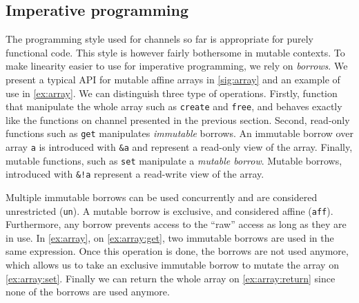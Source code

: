 
\subsection{Imperative programming}

The programming style used for channels so far is
appropriate for purely functional code.
This style is however fairly bothersome in mutable contexts.
%
To make linearity easier to use for imperative programming, we rely on
{\em borrows}. We present a typical API for mutable affine arrays
in \cref{sig:array} and an example of use in \cref{ex:array}.
We can distinguish three type of operations. Firstly,
function that manipulate the whole
array such as \lstinline/create/ and \lstinline/free/, and behaves exactly
like the functions on channel presented in the previous section.
Second, read-only functions such as \lstinline/get/
manipulates \emph{immutable} borrows. An immutable borrow over array \lstinline/a/
is introduced with \lstinline/&a/ and represent a read-only view of the array.
Finally, mutable functions, such as \lstinline/set/ manipulate
a \emph{mutable borrow}. Mutable borrows, introduced with \lstinline/&!a/
represent a read-write view of the array.

Multiple immutable borrows can be used concurrently and are considered
unrestricted (\lstinline/un/).
A mutable borrow is exclusive, and considered affine (\lstinline/aff/).
Furthermore, any borrow prevents access to the ``raw'' access
as long as they are in use. In \cref{ex:array}, on \cref{ex:array:get},
two immutable borrows are used in the same expression. Once this operation
is done, the borrows are not used anymore, which allows us to take
an exclusive immutable borrow to mutate the array on \cref{ex:array:set}.
Finally we can return the whole array on \cref{ex:array:return} since
none of the borrows are used anymore.

